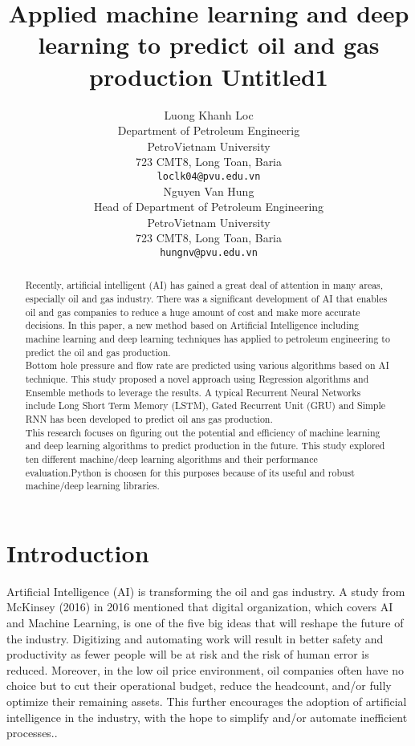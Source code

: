 \documentclass[english]{article}
\title{Applied machine learning and deep learning to predict oil and gas production }
\author{
  Luong Khanh Loc\\%
  Department of Petroleum Engineerig\\
  PetroVietnam University\\
  723 CMT8, Long Toan, Baria \\
  \texttt{loclk04@pvu.edu.vn} \\
   \And
 Nguyen Van Hung \\
  Head of Department of Petroleum Engineering\\
  PetroVietnam University\\
  723 CMT8, Long Toan, Baria \\
  \texttt{hungnv@pvu.edu.vn} \\
}
\title{Untitled1}
\begin{document}
\maketitle

\begin{abstract}
Recently, artificial intelligent (AI) has gained a great deal of attention in many areas, especially oil and gas industry. There was a significant development of AI that enables oil and gas companies to reduce a huge amount of cost and make more accurate decisions. In this paper, a new method based on Artificial Intelligence including machine learning and deep learning techniques has applied to petroleum engineering to predict the oil and gas production.\\
Bottom hole pressure and flow rate are predicted using various algorithms based on AI technique. This study proposed a novel approach using Regression algorithms and Ensemble methods to leverage the results. A  typical Recurrent Neural Networks include Long Short Term Memory (LSTM), Gated Recurrent Unit (GRU) and Simple RNN has been developed to predict oil ans gas production. \\
This research focuses on figuring out the potential and efficiency of machine learning and deep learning algorithms to predict production in the future. This study explored ten different machine/deep learning algorithms and their performance evaluation.Python is choosen for this purposes because of its useful and robust machine/deep learning libraries.
\end{abstract}






\section{Introduction}
\label{sec:headings}
Artificial Intelligence (AI) is transforming the oil and gas industry. A study from McKinsey (2016) in 2016 mentioned that digital organization, which covers AI and Machine Learning, is one of the five big ideas that will reshape the future of the industry. Digitizing and automating work will result in better safety and productivity as fewer people will be at risk and the risk of human error is reduced. Moreover, in the low oil price environment, oil companies often have no choice but to cut their operational budget, reduce the headcount, and/or fully optimize their remaining assets. This further encourages the adoption of artificial intelligence in the industry, with the hope to simplify and/or automate inefficient processes.\cite{Ristanto}.\\
\end{document}
